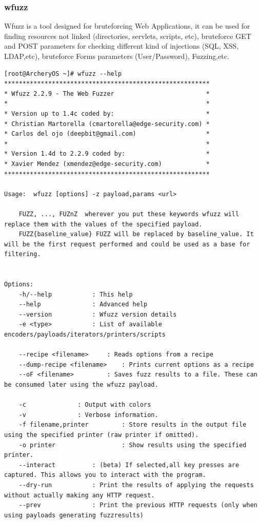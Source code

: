 \documentclass{article}
\begin{document}
\subsubsection{wfuzz}
Wfuzz is a tool designed for bruteforcing Web Applications, it can be used for finding resources not linked (directories, servlets, scripts, etc), bruteforce GET and POST parameters for checking different kind of injections (SQL, XSS, LDAP,etc), bruteforce Forms parameters (User/Password), Fuzzing,etc.
\begin{lstlisting}
[root@ArcheryOS ~]# wfuzz --help
********************************************************
* Wfuzz 2.2.9 - The Web Fuzzer                         *
*                                                      *
* Version up to 1.4c coded by:                         *
* Christian Martorella (cmartorella@edge-security.com) *
* Carlos del ojo (deepbit@gmail.com)                   *
*                                                      *
* Version 1.4d to 2.2.9 coded by:                      *
* Xavier Mendez (xmendez@edge-security.com)            *
********************************************************

Usage:	wfuzz [options] -z payload,params <url>

	FUZZ, ..., FUZnZ  wherever you put these keywords wfuzz will replace them with the values of the specified payload. 
	FUZZ{baseline_value} FUZZ will be replaced by baseline_value. It will be the first request performed and could be used as a base for filtering.


Options:
	-h/--help		    : This help
	--help			    : Advanced help
	--version		    : Wfuzz version details
	-e <type>		    : List of available encoders/payloads/iterators/printers/scripts
	
	--recipe <filename>	    : Reads options from a recipe
	--dump-recipe <filename>    : Prints current options as a recipe
	--oF <filename>   	    : Saves fuzz results to a file. These can be consumed later using the wfuzz payload.
	
	-c			    : Output with colors
	-v			    : Verbose information.
	-f filename,printer         : Store results in the output file using the specified printer (raw printer if omitted).
	-o printer                  : Show results using the specified printer.
	--interact		    : (beta) If selected,all key presses are captured. This allows you to interact with the program.
	--dry-run		    : Print the results of applying the requests without actually making any HTTP request.
	--prev    		    : Print the previous HTTP requests (only when using payloads generating fuzzresults)
	

\end{lstlisting}
\end{document}
